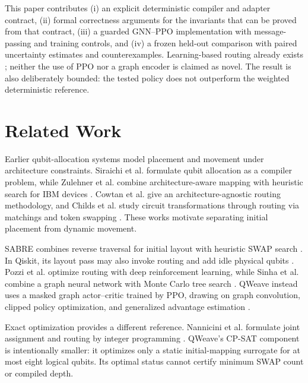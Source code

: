 \documentclass[a4paper,11pt,twocolumn]{article}
\begin{document}
This paper contributes (i) an explicit deterministic compiler and adapter
contract, (ii) formal correctness arguments for the invariants that can be
proved from that contract, (iii) a guarded GNN--PPO implementation with
message-passing and training controls, and (iv) a frozen held-out comparison
with paired uncertainty estimates and counterexamples. Learning-based routing
already exists \citep{pozzi2020rl,sinha2022gnn}; neither the use of PPO nor a
graph encoder is claimed as novel. The result is also deliberately bounded:
the tested policy does not outperform the weighted deterministic reference.

\section{Related Work}
Earlier qubit-allocation systems model placement and movement under
architecture constraints. Siraichi et al. formulate qubit allocation as a
compiler problem, while Zulehner et al. combine architecture-aware mapping with
heuristic search for IBM devices \citep{siraichi2018allocation,zulehner2019efficient}.
Cowtan et al. give an architecture-agnostic routing methodology, and Childs et
al. study circuit transformations through routing via matchings and token
swapping \citep{cowtan2019routing,childs2019transformations}. These works
motivate separating initial placement from dynamic movement.

SABRE combines reverse traversal for initial layout with heuristic SWAP search
\citep{li2019sabre}. In Qiskit, its layout pass may also invoke routing and add
idle physical qubits \citep{ibmsabre}. Pozzi et al. optimize routing with deep
reinforcement learning, while Sinha et al. combine a graph neural network with
Monte Carlo tree search \citep{pozzi2020rl,sinha2022gnn}. QWeave instead uses
a masked graph actor--critic trained by PPO, drawing on graph convolution,
clipped policy optimization, and generalized advantage estimation
\citep{kipf2017gcn,schulman2017ppo,schulman2015gae}.

Exact optimization provides a different reference. Nannicini et al. formulate
joint assignment and routing by integer programming
\citep{nannicini2022ip}. QWeave's CP-SAT component is intentionally smaller:
it optimizes only a static initial-mapping surrogate for at most eight logical
qubits. Its optimal status cannot certify minimum SWAP count or compiled depth.
\end{document}
